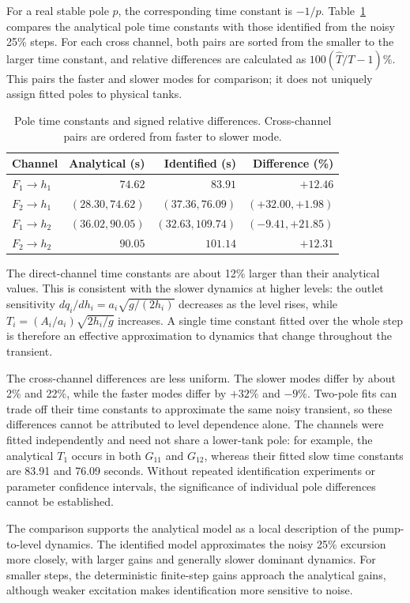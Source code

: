 For a real stable pole $p$, the corresponding time constant is $-1/p$.
Table~\ref{tab:p5-time-constants} compares the analytical pole time
constants with those identified from the noisy 25\% steps. For each
cross channel, both pairs are sorted from the smaller to the larger
time constant, and relative differences are calculated as
$100(\widehat T/T-1)\%$. This pairs the faster and slower modes for
comparison; it does not uniquely assign fitted poles to physical tanks.
\begin{table}[htbp]
 \centering
 \caption{Pole time constants and signed relative differences. Cross-channel
 pairs are ordered from faster to slower mode.}
 \label{tab:p5-time-constants}
 \begin{tabular}{lrrr}
 \hline
 Channel & Analytical (s) & Identified (s) & Difference (\%)\\
 \hline
 $F_1\to h_1$ & $74.62$ & $83.91$ & $+12.46$\\
 $F_2\to h_1$ & $(28.30,74.62)$ & $(37.36,76.09)$ & $(+32.00,+1.98)$\\
 $F_1\to h_2$ & $(36.02,90.05)$ & $(32.63,109.74)$ & $(-9.41,+21.85)$\\
 $F_2\to h_2$ & $90.05$ & $101.14$ & $+12.31$\\
 \hline
 \end{tabular}
\end{table}

The direct-channel time constants are about 12\% larger than their
analytical values. This is consistent with the slower dynamics at higher
levels: the outlet sensitivity $dq_i/dh_i=a_i\sqrt{g/(2h_i)}$ decreases
as the level rises, while
$T_i=(A_i/a_i)\sqrt{2h_i/g}$ increases. A single time constant fitted
over the whole step is therefore an effective approximation to dynamics
that change throughout the transient.

The cross-channel differences are less uniform. The slower modes differ
by about 2\% and 22\%, while the faster modes differ by $+32\%$ and
$-9\%$. Two-pole fits can trade off their time constants to approximate
the same noisy transient, so these differences cannot be attributed to
level dependence alone. The channels were fitted independently and need
not share a lower-tank pole: for example, the analytical $T_1$ occurs in
both $G_{11}$ and $G_{12}$, whereas their fitted slow time constants are
83.91 and 76.09 seconds. Without repeated identification experiments or
parameter confidence intervals, the significance of individual pole
differences cannot be established.

The comparison supports the analytical model as a local description of
the pump-to-level dynamics. The identified model approximates the noisy
25\% excursion more closely, with larger gains and generally slower
dominant dynamics. For smaller steps, the deterministic finite-step
gains approach the analytical gains, although weaker excitation makes
identification more sensitive to noise.
